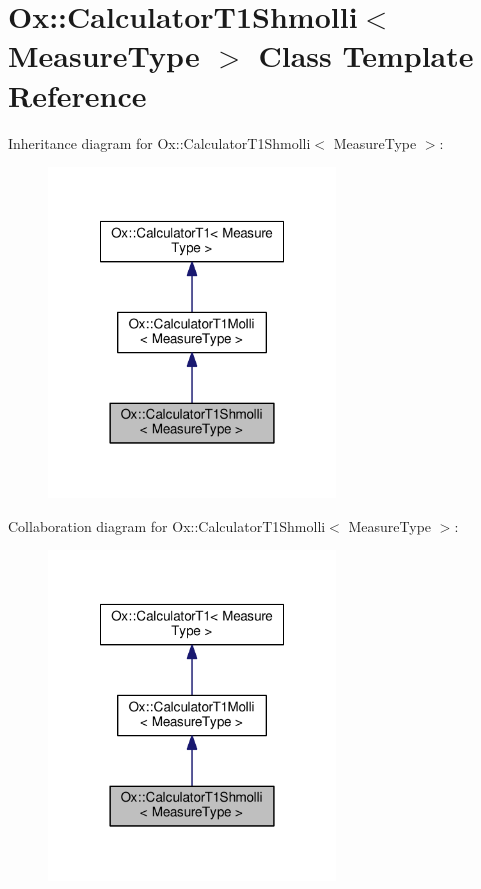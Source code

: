 \hypertarget{class_ox_1_1_calculator_t1_shmolli}{\section{Ox\-:\-:Calculator\-T1\-Shmolli$<$ Measure\-Type $>$ Class Template Reference}
\label{class_ox_1_1_calculator_t1_shmolli}
}


Inheritance diagram for Ox\-:\-:Calculator\-T1\-Shmolli$<$ Measure\-Type $>$\-:
\nopagebreak
\begin{figure}[H]
\begin{center}
\leavevmode
\includegraphics[width=216pt]{class_ox_1_1_calculator_t1_shmolli__inherit__graph}
\end{center}
\end{figure}


Collaboration diagram for Ox\-:\-:Calculator\-T1\-Shmolli$<$ Measure\-Type $>$\-:
\nopagebreak
\begin{figure}[H]
\begin{center}
\leavevmode
\includegraphics[width=216pt]{class_ox_1_1_calculator_t1_shmolli__coll__graph}
\end{center}
\end{figure}
